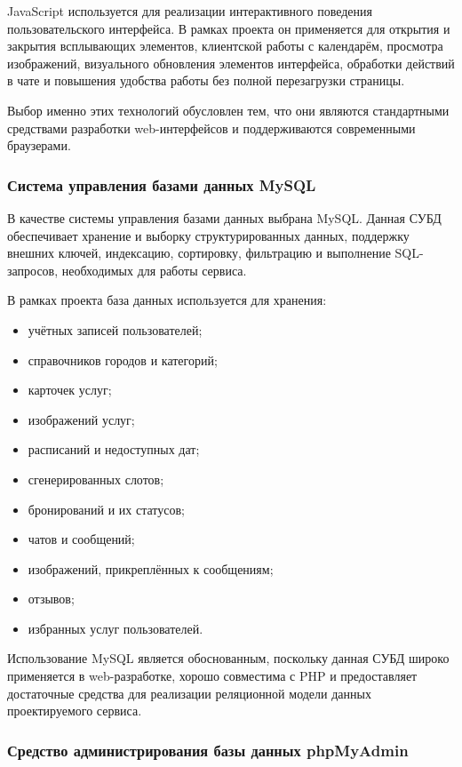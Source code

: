 JavaScript используется для реализации интерактивного поведения пользовательского интерфейса. В рамках проекта он применяется для открытия и закрытия всплывающих элементов, клиентской работы с календарём, просмотра изображений, визуального обновления элементов интерфейса, обработки действий в чате и повышения удобства работы без полной перезагрузки страницы.

Выбор именно этих технологий обусловлен тем, что они являются стандартными средствами разработки web-интерфейсов и поддерживаются современными браузерами.

\subsubsection{Система управления базами данных MySQL}

В качестве системы управления базами данных выбрана MySQL. Данная СУБД обеспечивает хранение и выборку структурированных данных, поддержку внешних ключей, индексацию, сортировку, фильтрацию и выполнение SQL-запросов, необходимых для работы сервиса.

В рамках проекта база данных используется для хранения:
\begin{itemize}
	\item учётных записей пользователей;
	\item справочников городов и категорий;
	\item карточек услуг;
	\item изображений услуг;
	\item расписаний и недоступных дат;
	\item сгенерированных слотов;
	\item бронирований и их статусов;
	\item чатов и сообщений;
	\item изображений, прикреплённых к сообщениям;
	\item отзывов;
	\item избранных услуг пользователей.
\end{itemize}

Использование MySQL является обоснованным, поскольку данная СУБД широко применяется в web-разработке, хорошо совместима с PHP и предоставляет достаточные средства для реализации реляционной модели данных проектируемого сервиса.

\subsubsection{Средство администрирования базы данных phpMyAdmin}

